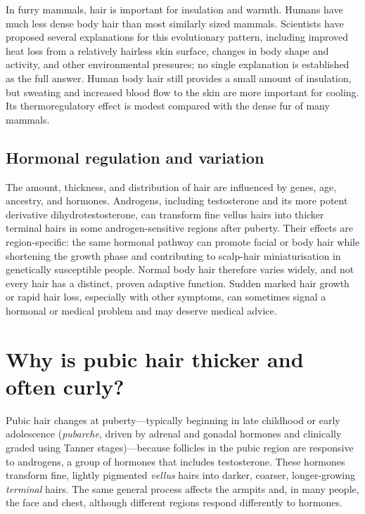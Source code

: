 \documentclass[11pt,oneside]{report}
\begin{document}
In furry mammals, hair is important for insulation and warmth. Humans have much
less dense body hair than most similarly sized mammals. Scientists have proposed
several explanations for this evolutionary pattern, including improved heat loss
from a relatively hairless skin surface, changes in body shape and activity, and
other environmental pressures; no single explanation is established as the full
answer. Human body hair still provides a small amount of insulation, but sweating
and increased blood flow to the skin are more important for cooling. Its
thermoregulatory effect is modest compared with the dense fur of many mammals.

\subsection*{Hormonal regulation and variation}

The amount, thickness, and distribution of hair are influenced by genes, age,
ancestry, and hormones. Androgens, including testosterone and its more potent
derivative dihydrotestosterone, can transform fine vellus hairs into thicker
terminal hairs in some androgen-sensitive regions after puberty. Their effects
are region-specific: the same hormonal pathway can promote facial or body hair
while shortening the growth phase and contributing to scalp-hair
miniaturisation in genetically susceptible people. Normal body hair therefore
varies widely, and not every hair has a distinct, proven adaptive function.
Sudden marked hair growth or rapid hair loss, especially with other symptoms,
can sometimes signal a hormonal or medical problem and may deserve medical
advice.

\section{Why is pubic hair thicker and often curly?}

Pubic hair changes at puberty—typically beginning in late childhood or early
adolescence (\emph{pubarche}, driven by adrenal and gonadal hormones and
clinically graded using Tanner stages)—because follicles in the pubic region are
responsive to androgens, a group of hormones that includes testosterone. These
hormones transform fine, lightly pigmented \emph{vellus} hairs into darker,
coarser, longer-growing \emph{terminal} hairs. The same general process affects
the armpits and, in many people, the face and chest, although different regions
respond differently to hormones.
\end{document}
